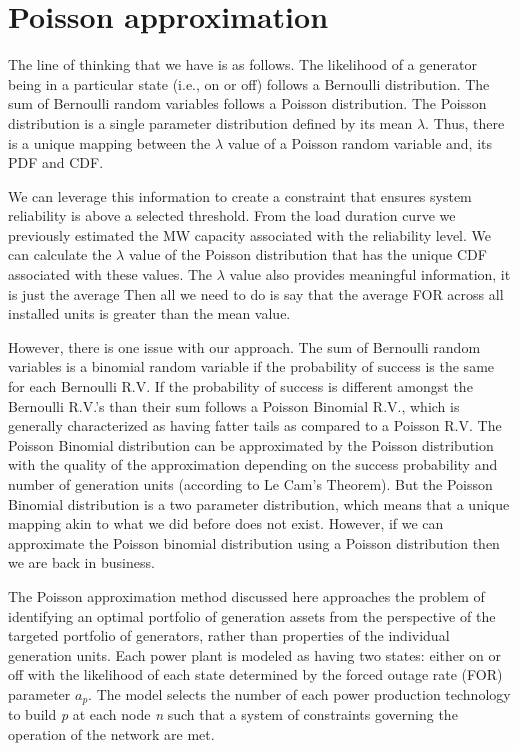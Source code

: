 \documentclass[10pt]{amsart}
\begin{document}
\section{Poisson approximation}
The line of thinking that we have is as follows.
The likelihood of a generator being in a particular state (i.e., on or off) follows a Bernoulli distribution.
The sum of Bernoulli random variables follows a Poisson distribution.
The Poisson distribution is a single parameter distribution defined by its mean $\lambda$. 
Thus, there is a unique mapping between the $\lambda$ value of a Poisson random variable and, its PDF and CDF.

We can leverage this information to create a constraint that ensures system reliability is above a selected threshold. 
From the load duration curve we previously estimated the MW capacity associated with the reliability level.
We can calculate the $\lambda$ value of the Poisson distribution that has the unique CDF associated with these values. 
The $\lambda$ value also provides meaningful information, it is just the average 
Then all we need to do is say that the average FOR across all installed units is greater than the mean value.

However, there is one issue with our approach.
The sum of Bernoulli random variables is a binomial random variable if the probability of success is the same for each Bernoulli R.V.
If the probability of success is different amongst the Bernoulli R.V.'s than their sum follows a Poisson Binomial R.V., which is generally characterized as having fatter tails as compared to a Poisson R.V.
The Poisson Binomial distribution can be approximated by the Poisson distribution with the quality of the approximation depending on the success probability and number of generation units (according to Le Cam's Theorem).
But the Poisson Binomial distribution is a two parameter distribution, which means that a unique mapping akin to what we did before does not exist.
However, if we can approximate the Poisson binomial distribution using a Poisson distribution then we are back in business. 

The Poisson approximation method discussed here approaches the problem of identifying an optimal portfolio of generation assets from the perspective of the targeted portfolio of generators, rather than properties of the individual generation units.
Each power plant is modeled as having two states: either on or off with the likelihood of each state determined by the forced outage rate (FOR) parameter \textit{$a_{p}$}.
The model selects the number of each power production technology to build \textit{p} at each node \textit{n} such that a system of constraints governing the operation of the network are met.
\end{document}
